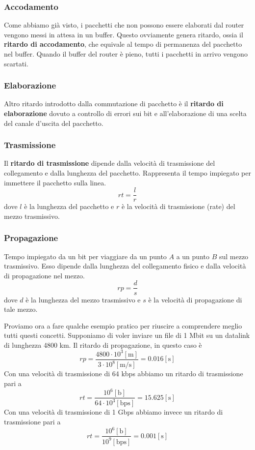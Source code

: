 \subsubsection{Accodamento}
Come abbiamo già visto, i pacchetti che non possono essere elaborati 
dal router vengono messi in attesa in un buffer. Questo ovviamente 
genera ritardo, ossia il \textbf{ritardo di accodamento}, che equivale 
al tempo di permanenza del pacchetto nel buffer. Quando il buffer del 
router è pieno, tutti i pacchetti in arrivo vengono scartati.

\subsubsection{Elaborazione}
Altro ritardo introdotto dalla commutazione di pacchetto è il 
\textbf{ritardo di elaborazione} dovuto a controllo di errori sui bit 
e all'elaborazione di una scelta del canale d'uscita del pacchetto.

\subsubsection{Trasmissione}
Il \textbf{ritardo di trasmissione} dipende dalla velocità di 
trasmissione del collegamento e dalla lunghezza del pacchetto. 
Rappresenta il tempo impiegato per immettere il pacchetto sulla linea.
\[ rt = \frac{l}{r} \]
dove $l$ è la lunghezza del pacchetto e $r$ è la velocità di 
trasmissione (rate) del mezzo trasmissivo.

\subsubsection{Propagazione}
Tempo impiegato da un bit per viaggiare da un punto $A$ a un punto $B$
sul mezzo trasmissivo. Esso dipende dalla lunghezza del collegamento 
fisico e dalla velocità di propagazione nel mezzo.
\[ rp = \frac{d}{s} \]
dove $d$ è la lunghezza del mezzo trasmissivo e $s$ è la velocità di 
propagazione di tale mezzo.

Proviamo ora a fare qualche esempio pratico per riuscire a comprendere 
meglio tutti questi concetti. Supponiamo di voler inviare un file di 
1 Mbit su un datalink di lunghezza 4800 km. Il ritardo di propagazione,
in questo caso è
\[
	rp = \frac{4800 \cdot 10^3 [\text{m}]}{3 \cdot 
	10^8 [\text{m/s}]} = 0.016 [\text{s}]
\]
Con una velocità di trasmissione di 64 kbps abbiamo un ritardo di
trasmissione pari a
\[ 
	rt = \frac{10^6 [\text{b}]}{64 \cdot 10^3 [\text{bps}]} = 
	15.625 [\text{s}]
\]
Con una velocità di trasmissione di 1 Gbps abbiamo invece un ritardo di
trasmissione pari a
\[ rt = \frac{10^6 [\text{b}]}{10^9 [\text{bps}]} = 0.001 [\text{s}] \]


